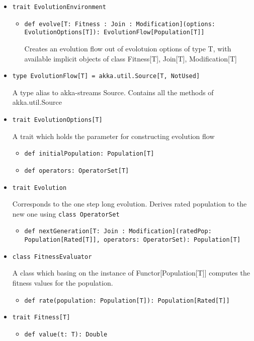 \begin{itemize}

\item \texttt{trait EvolutionEnvironment}

	\begin{itemize}
		\item \texttt{def evolve[T: Fitness : Join : Modification](options: EvolutionOptions[T]): EvolutionFlow[Population[T]]}

		Creates an evolution flow out of evolotuion options of type T, with available implicit objects of class Fitness[T], Join[T], Modification[T]
	\end{itemize}

\smallskip
\item \texttt{type EvolutionFlow[T] = akka.util.Source[T, NotUsed]}

A type alias to akka-streams Source. Contains all the methods of akka.util.Source

\smallskip
\item \texttt{trait EvolutionOptions[T]}

A trait which holds the parameter for constructing evolution flow
\begin{itemize}
	\item \texttt{def initialPopulation: Population[T]}
	\item \texttt{def operators: OperatorSet[T]}
\end{itemize}

\smallskip
\item \texttt{trait Evolution}

Corresponds to the one step long evolution. Derives rated population to the new one using \texttt{class OperatorSet}
\begin{itemize}
	\item \texttt{def nextGeneration[T: Join : Modification](ratedPop: Population[Rated[T]], operators: OperatorSet): Population[T]}
\end{itemize}

\smallskip
\item \texttt{class FitnessEvaluator}

A class which basing on the instance of Functor[Population[T]] computes the fitness values for the population.
\begin{itemize}
	\item \texttt{def rate(population: Population[T]): Population[Rated[T]]}
\end{itemize}

\smallskip
\item \texttt{trait Fitness[T]}
\begin{itemize}
	\item \texttt{def value(t: T): Double}
	

\end{itemize}
\end{itemize}
